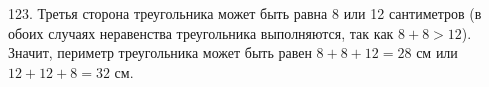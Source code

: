123. Третья сторона треугольника может быть равна 8 или 12 сантиметров (в обоих случаях неравенства треугольника выполняются, так как $8+8>12$). Значит, периметр треугольника может быть равен $8+8+12=28$ см или $12+12+8=32$ см.\\
